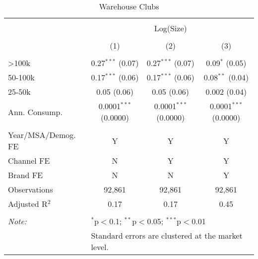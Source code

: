 
\begin{table}[!htbp] \centering 
  \caption{Warehouse Clubs} 
  \label{tab:packageSizeWarehouseSoda} 
\begin{tabular}{@{\extracolsep{5pt}}lccc} 
\\[-1.8ex]\hline 
\hline \\[-1.8ex] 
 & \multicolumn{3}{c}{Log(Size)} \\ 
\\[-1.8ex] & (1) & (2) & (3)\\ 
\hline \\[-1.8ex] 
 >100k & 0.27$^{***}$ (0.07) & 0.27$^{***}$ (0.07) & 0.09$^{*}$ (0.05) \\ 
  50-100k & 0.17$^{***}$ (0.06) & 0.17$^{***}$ (0.06) & 0.08$^{**}$ (0.04) \\ 
  25-50k & 0.05 (0.06) & 0.05 (0.06) & 0.002 (0.04) \\ 
  Ann. Consump. & 0.0001$^{***}$ (0.0000) & 0.0001$^{***}$ (0.0000) & 0.0001$^{***}$ (0.0000) \\ 
 \hline \\[-1.8ex] 
Year/MSA/Demog. FE & Y & Y & Y \\ 
Channel FE & N & Y & Y \\ 
Brand FE & N & N & Y \\ 
Observations & 92,861 & 92,861 & 92,861 \\ 
Adjusted R$^{2}$ & 0.17 & 0.17 & 0.45 \\ 
\hline 
\hline \\[-1.8ex] 
\textit{Note:}  & \multicolumn{3}{l}{$^{*}$p$<$0.1; $^{**}$p$<$0.05; $^{***}$p$<$0.01} \\ 
 & \multicolumn{3}{l}{Standard errors are clustered at the market level.} \\ 
\end{tabular} 
\end{table} 
